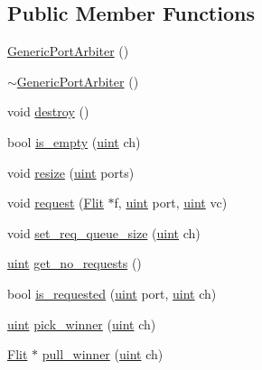 \subsection*{Public Member Functions}
\begin{CompactItemize}
\item 
\hyperlink{classGenericPortArbiter_d7a567eb5055a68231d045583ed8d5a7}{GenericPortArbiter} ()
\item 
\hyperlink{classGenericPortArbiter_2bd7c52f5d2a71863f73f6922520fef8}{$\sim$GenericPortArbiter} ()
\item 
void \hyperlink{classGenericPortArbiter_c4375af1ce810c31e11c03a3b3ffc426}{destroy} ()
\item 
bool \hyperlink{classGenericPortArbiter_a01546e85da0a6d1c1194fbf82f013bb}{is\_\-empty} (\hyperlink{outputBuffer_8h_91ad9478d81a7aaf2593e8d9c3d06a14}{uint} ch)
\item 
void \hyperlink{classGenericPortArbiter_3b94b47628229ee3142907005020eb86}{resize} (\hyperlink{outputBuffer_8h_91ad9478d81a7aaf2593e8d9c3d06a14}{uint} ports)
\item 
void \hyperlink{classGenericPortArbiter_1480ee32b7d8003479d2404a4b279c56}{request} (\hyperlink{classFlit}{Flit} $\ast$f, \hyperlink{outputBuffer_8h_91ad9478d81a7aaf2593e8d9c3d06a14}{uint} port, \hyperlink{outputBuffer_8h_91ad9478d81a7aaf2593e8d9c3d06a14}{uint} vc)
\item 
void \hyperlink{classGenericPortArbiter_50daec6e98669e01d74557dfb84b462f}{set\_\-req\_\-queue\_\-size} (\hyperlink{outputBuffer_8h_91ad9478d81a7aaf2593e8d9c3d06a14}{uint} ch)
\item 
\hyperlink{outputBuffer_8h_91ad9478d81a7aaf2593e8d9c3d06a14}{uint} \hyperlink{classGenericPortArbiter_f58d4de9d0b9e07a44f3f7185f4d11d9}{get\_\-no\_\-requests} ()
\item 
bool \hyperlink{classGenericPortArbiter_b94c8e8e707e00e3265008691fd7c696}{is\_\-requested} (\hyperlink{outputBuffer_8h_91ad9478d81a7aaf2593e8d9c3d06a14}{uint} port, \hyperlink{outputBuffer_8h_91ad9478d81a7aaf2593e8d9c3d06a14}{uint} ch)
\item 
\hyperlink{outputBuffer_8h_91ad9478d81a7aaf2593e8d9c3d06a14}{uint} \hyperlink{classGenericPortArbiter_528c492e74ec10b4ffa2a87d1454b446}{pick\_\-winner} (\hyperlink{outputBuffer_8h_91ad9478d81a7aaf2593e8d9c3d06a14}{uint} ch)
\item 
\hyperlink{classFlit}{Flit} $\ast$ \hyperlink{classGenericPortArbiter_6cc8ecf3ac1cda783e762dc9c139fe01}{pull\_\-winner} (\hyperlink{outputBuffer_8h_91ad9478d81a7aaf2593e8d9c3d06a14}{uint} ch)

\end{CompactItemize}
